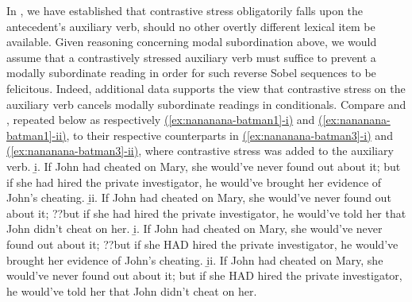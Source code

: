 In , we have established that contrastive stress obligatorily falls upon the antecedent's auxiliary verb, should no other overtly different lexical item be available. Given reasoning concerning modal subordination above, we would assume that a contrastively stressed auxiliary verb must suffice to prevent a modally subordinate reading in order for such reverse Sobel sequences to be felicitous. Indeed, additional data supports the view that contrastive stress on the auxiliary verb cancels modally subordinate readings in conditionals. Compare  and , repeated below as respectively \hyperref[ex:nananana-batman1]{(\ref*{ex:nananana-batman1}-i)} and \hyperref[ex:nananana-batman1]{(\ref*{ex:nananana-batman1}-ii)}, to their respective counterparts in \hyperref[ex:nananana-batman3]{(\ref*{ex:nananana-batman3}-i)} and \hyperref[ex:nananana-batman3]{(\ref*{ex:nananana-batman3}-ii)}, where contrastive stress was added to the auxiliary verb.
\pex
{}
\a {}\beginsubsub
\b{i.} If John had cheated on Mary, she would've never found out about it; but if she had hired the private investigator, he would've brought her evidence of John's cheating.
\b{ii.} If John had cheated on Mary, she would've never found out about it; {??}but if she had hired the private investigator, he would've told her that John didn't cheat on her.
\endsubsub\pagebreak
\a {}\beginsubsub
\b{i.} If John had cheated on Mary, she would've never found out about it; {??}but if she \MakeUppercase{had} hired the private investigator, he would've brought her evidence of John's cheating.
\b{ii.} If John had cheated on Mary, she would've never found out about it; but if she \MakeUppercase{had} hired the private investigator, he would've told her that John didn't cheat on her.
\endsubsub
\xe

